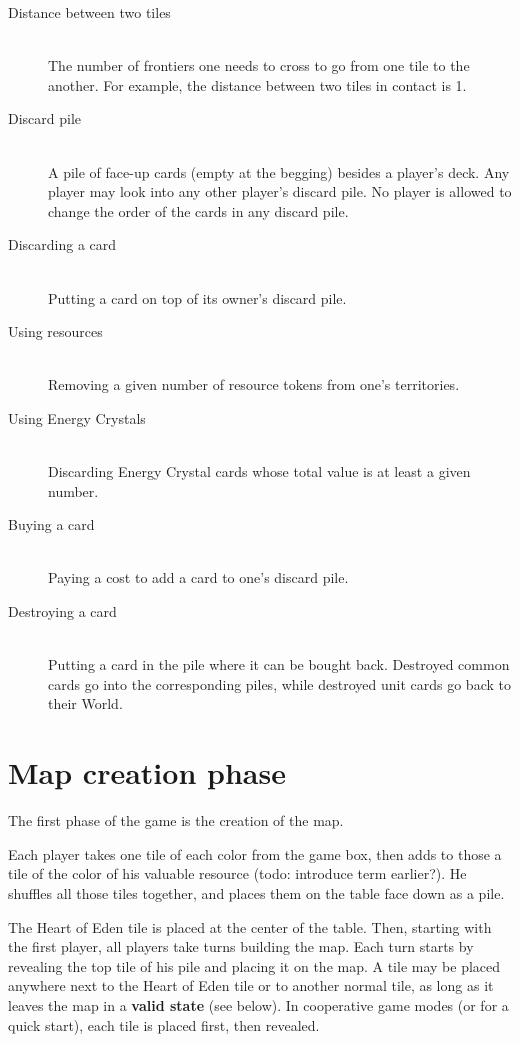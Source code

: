 \documentclass[a4paper]{article}
\begin{document}
    \begin{description}
        \item[Distance between two tiles] \hfill \\
            The number of frontiers one needs to cross to go from one tile to the another.
            For example, the distance between two tiles in contact is 1.
        \item[Discard pile] \hfill \\
            A pile of face-up cards (empty at the begging) besides a player's deck.
            Any player may look into any other player's discard pile.
            No player is allowed to change the order of the cards in any discard pile.
        \item[Discarding a card] \hfill \\
            Putting a card on top of its owner's discard pile.
        \item[Using resources] \hfill \\
            Removing a given number of resource tokens from one's territories.
        \item[Using Energy Crystals] \hfill \\
            Discarding Energy Crystal cards whose total value is at least a given number.
        \item[Buying a card] \hfill \\
            Paying a cost to add a card to one's discard pile.
        \item[Destroying a card] \hfill \\
            Putting a card in the pile where it can be bought back.
            Destroyed common cards go into the corresponding piles,
            while destroyed unit cards go back to their World.
    \end{description}


\newpage
\section{Map creation phase}

    The first phase of the game is the creation of the map.
    
    Each player takes one tile of each color from the game box,
    then adds to those a tile of the color of his valuable resource
    (todo: introduce term earlier?).
    He shuffles all those tiles together,
    and places them on the table face down as a pile.
    
    The Heart of Eden tile is placed at the center of the table.
    Then, starting with the first player, all players take turns building the map.
    Each turn starts by revealing the top tile of his pile and placing it on the map.
    A tile may be placed anywhere next to the Heart of Eden tile or to another normal
    tile, as long as it leaves the map in a \textbf{valid state} (see below).
    In cooperative game modes (or for a quick start), each tile is placed first,
    then revealed.
    
\end{document}
